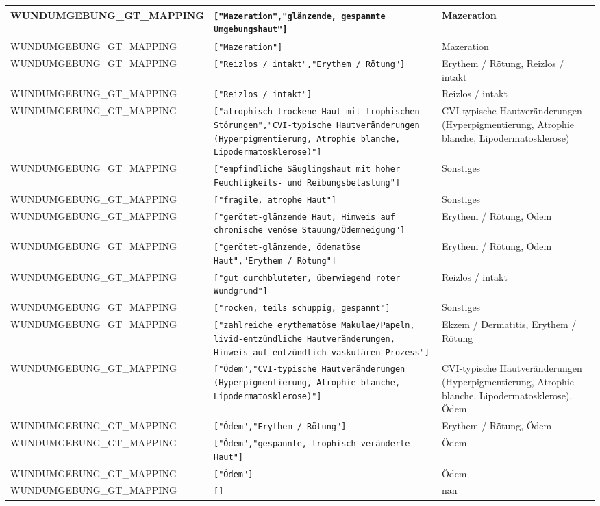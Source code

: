 \begin{longtable}{|p{3.5cm}|p{5cm}|p{6.5cm}|}
WUNDUMGEBUNG\_GT\_MAPPING & \texttt{["Mazeration","glänzende, gespannte Umgebungshaut"]} & Mazeration \\ \hline
WUNDUMGEBUNG\_GT\_MAPPING & \texttt{["Mazeration"]} & Mazeration \\ \hline
WUNDUMGEBUNG\_GT\_MAPPING & \texttt{["Reizlos / intakt","Erythem / Rötung"]} & Erythem / Rötung, Reizlos / intakt \\ \hline
WUNDUMGEBUNG\_GT\_MAPPING & \texttt{["Reizlos / intakt"]} & Reizlos / intakt \\ \hline
WUNDUMGEBUNG\_GT\_MAPPING & \texttt{["atrophisch-trockene Haut mit trophischen Störungen","CVI-typische Hautveränderungen (Hyperpigmentierung, Atrophie blanche, Lipodermatosklerose)"]} & CVI-typische Hautveränderungen (Hyperpigmentierung, Atrophie blanche, Lipodermatosklerose) \\ \hline
WUNDUMGEBUNG\_GT\_MAPPING & \texttt{["empfindliche Säuglingshaut mit hoher Feuchtigkeits- und Reibungsbelastung"]} & Sonstiges \\ \hline
WUNDUMGEBUNG\_GT\_MAPPING & \texttt{["fragile, atrophe Haut"]} & Sonstiges \\ \hline
WUNDUMGEBUNG\_GT\_MAPPING & \texttt{["gerötet-glänzende Haut, Hinweis auf chronische venöse Stauung/Ödemneigung"]} & Erythem / Rötung, Ödem \\ \hline
WUNDUMGEBUNG\_GT\_MAPPING & \texttt{["gerötet-glänzende, ödematöse Haut","Erythem / Rötung"]} & Erythem / Rötung, Ödem \\ \hline
WUNDUMGEBUNG\_GT\_MAPPING & \texttt{["gut durchbluteter, überwiegend roter Wundgrund"]} & Reizlos / intakt \\ \hline
WUNDUMGEBUNG\_GT\_MAPPING & \texttt{["rocken, teils schuppig, gespannt"]} & Sonstiges \\ \hline
WUNDUMGEBUNG\_GT\_MAPPING & \texttt{["zahlreiche erythematöse Makulae/Papeln, livid-entzündliche Hautveränderungen, Hinweis auf entzündlich-vaskulären Prozess"]} & Ekzem / Dermatitis, Erythem / Rötung \\ \hline
WUNDUMGEBUNG\_GT\_MAPPING & \texttt{["Ödem","CVI-typische Hautveränderungen (Hyperpigmentierung, Atrophie blanche, Lipodermatosklerose)"]} & CVI-typische Hautveränderungen (Hyperpigmentierung, Atrophie blanche, Lipodermatosklerose), Ödem \\ \hline
WUNDUMGEBUNG\_GT\_MAPPING & \texttt{["Ödem","Erythem / Rötung"]} & Erythem / Rötung, Ödem \\ \hline
WUNDUMGEBUNG\_GT\_MAPPING & \texttt{["Ödem","gespannte, trophisch veränderte Haut"]} & Ödem \\ \hline
WUNDUMGEBUNG\_GT\_MAPPING & \texttt{["Ödem"]} & Ödem \\ \hline
WUNDUMGEBUNG\_GT\_MAPPING & \texttt{[]} & nan \\ \hline
\end{longtable}